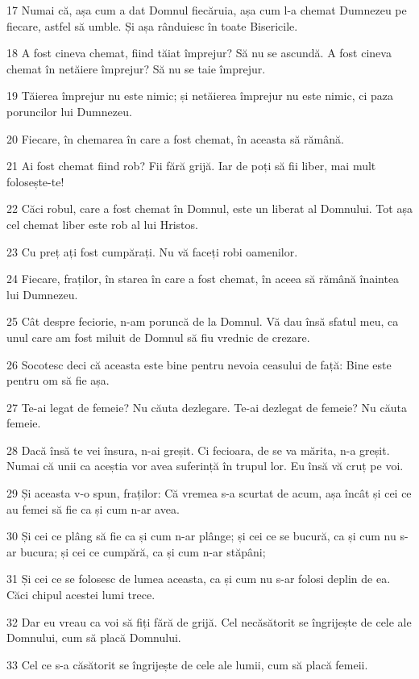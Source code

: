 \par 17 Numai că, așa cum a dat Domnul fiecăruia, așa cum l-a chemat Dumnezeu pe fiecare, astfel să umble. Și așa rânduiesc în toate Bisericile.
\par 18 A fost cineva chemat, fiind tăiat împrejur? Să nu se ascundă. A fost cineva chemat în netăiere împrejur? Să nu se taie împrejur.
\par 19 Tăierea împrejur nu este nimic; și netăierea împrejur nu este nimic, ci paza poruncilor lui Dumnezeu.
\par 20 Fiecare, în chemarea în care a fost chemat, în aceasta să rămână.
\par 21 Ai fost chemat fiind rob? Fii fără grijă. Iar de poți să fii liber, mai mult folosește-te!
\par 22 Căci robul, care a fost chemat în Domnul, este un liberat al Domnului. Tot așa cel chemat liber este rob al lui Hristos.
\par 23 Cu preț ați fost cumpărați. Nu vă faceți robi oamenilor.
\par 24 Fiecare, fraților, în starea în care a fost chemat, în aceea să rămână înaintea lui Dumnezeu.
\par 25 Cât despre feciorie, n-am poruncă de la Domnul. Vă dau însă sfatul meu, ca unul care am fost miluit de Domnul să fiu vrednic de crezare.
\par 26 Socotesc deci că aceasta este bine pentru nevoia ceasului de față: Bine este pentru om să fie așa.
\par 27 Te-ai legat de femeie? Nu căuta dezlegare. Te-ai dezlegat de femeie? Nu căuta femeie.
\par 28 Dacă însă te vei însura, n-ai greșit. Ci fecioara, de se va mărita, n-a greșit. Numai că unii ca aceștia vor avea suferință în trupul lor. Eu însă vă cruț pe voi.
\par 29 Și aceasta v-o spun, fraților: Că vremea s-a scurtat de acum, așa încât și cei ce au femei să fie ca și cum n-ar avea.
\par 30 Și cei ce plâng să fie ca și cum n-ar plânge; și cei ce se bucură, ca și cum nu s-ar bucura; și cei ce cumpără, ca și cum n-ar stăpâni;
\par 31 Și cei ce se folosesc de lumea aceasta, ca și cum nu s-ar folosi deplin de ea. Căci chipul acestei lumi trece.
\par 32 Dar eu vreau ca voi să fiți fără de grijă. Cel necăsătorit se îngrijește de cele ale Domnului, cum să placă Domnului.
\par 33 Cel ce s-a căsătorit se îngrijește de cele ale lumii, cum să placă femeii.
